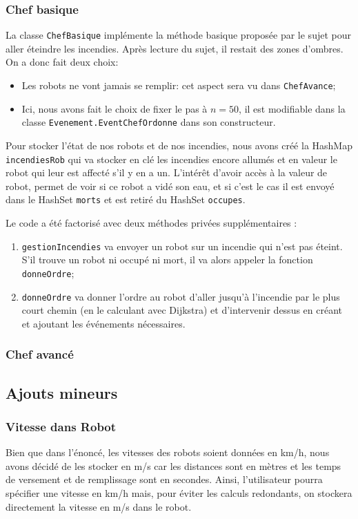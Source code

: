 \documentclass[a4paper,8pt]{article} %
\begin{document}
\subsubsection{Chef basique}
La  classe \texttt{ChefBasique} implémente la méthode basique proposée par le sujet pour aller éteindre les incendies.
Après lecture du sujet, il restait des zones d'ombres. On a donc fait deux choix:
\begin{itemize}
    \item Les robots ne vont jamais se remplir: cet aspect sera vu dans \texttt{ChefAvance};
    \item Ici, nous avons fait le choix de fixer le pas à $n=50$, il est modifiable dans la classe \texttt{Evenement.EventChefOrdonne} 
    dans son constructeur.
\end{itemize}

Pour stocker l'état de nos robots et de nos incendies, nous avons créé la HashMap \texttt{incendiesRob} qui va stocker en clé 
les incendies encore allumés et en valeur le robot qui leur est affecté s'il y en a un. L'intérêt d'avoir accès à la valeur de robot,
permet de voir si ce robot a vidé son eau, et si c'est le cas il est envoyé dans le HashSet \texttt{morts} 
et est retiré du HashSet \texttt{occupes}.

Le code a été factorisé avec deux méthodes privées supplémentaires :
\begin{enumerate}
    \item \texttt{gestionIncendies} va envoyer un robot sur un incendie qui n'est pas éteint. S'il trouve un robot ni occupé ni mort,
    il va alors appeler la fonction \texttt{donneOrdre};
    \item \texttt{donneOrdre} va donner l'ordre au robot d'aller jusqu'à l'incendie par le plus court chemin (en le calculant avec Dijkstra)
    et d'intervenir dessus en créant et ajoutant les événements nécessaires.
\end{enumerate}

\subsubsection{Chef avancé}

\subsection{Ajouts mineurs}
\subsubsection{Vitesse dans Robot}
Bien que dans l'énoncé, les vitesses des robots soient données en km/h, nous avons décidé de les stocker en m/s
car les distances sont en mètres et les temps de versement et de remplissage sont en secondes. Ainsi, l'utilisateur pourra spécifier une 
vitesse en km/h mais, pour éviter les calculs redondants, on stockera directement la vitesse en m/s dans le robot.
\end{document}
